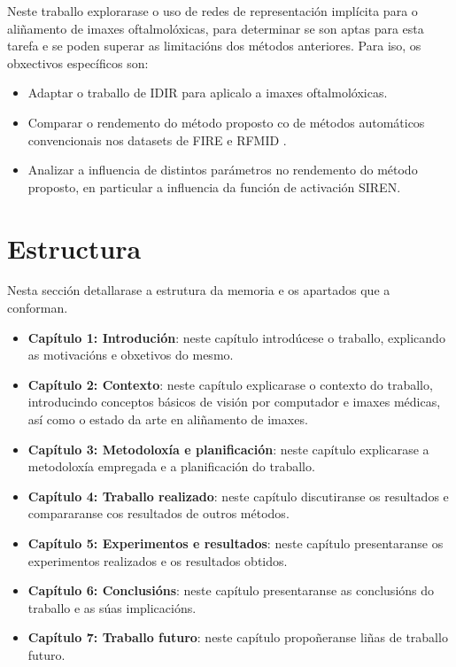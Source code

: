 Neste traballo explorarase o uso de redes de representación implícita para o aliñamento de imaxes oftalmolóxicas, para determinar se son aptas para esta tarefa e se poden superar as limitacións dos métodos anteriores.
Para iso, os obxectivos específicos son:
\begin{itemize}
    \item Adaptar o traballo de IDIR \cite{wolterink2021implicit} para aplicalo a imaxes oftalmolóxicas.
    \item Comparar o rendemento do método proposto co de métodos automáticos convencionais nos datasets de FIRE \cite{FIRE} e RFMID \cite{RFMiD}.
    \item Analizar a influencia de distintos parámetros no rendemento do método proposto, en particular a influencia da función de activación SIREN.
\end{itemize}

\section{Estructura }

Nesta sección detallarase a estrutura da memoria e os apartados que a conforman.

\begin{itemize}
    \item \textbf{Capítulo 1: Introdución}: neste capítulo introdúcese o traballo, explicando as motivacións e obxetivos do mesmo.
    \item \textbf{Capítulo 2: Contexto}: neste capítulo explicarase o contexto do traballo, introducindo conceptos básicos de visión por computador e imaxes médicas, así como o estado da arte en aliñamento de imaxes.
    \item \textbf{Capítulo 3: Metodoloxía e planificación}: neste capítulo explicarase a metodoloxía empregada e a planificación do traballo.
    \item \textbf{Capítulo 4: Traballo realizado}: neste capítulo discutiranse os resultados e compararanse cos resultados de outros métodos.
    \item \textbf{Capítulo 5: Experimentos e resultados}: neste capítulo presentaranse os experimentos realizados e os resultados obtidos. 
    \item \textbf{Capítulo 6: Conclusións}: neste capítulo presentaranse as conclusións do traballo e as súas implicacións.
    \item \textbf{Capítulo 7: Traballo futuro}: neste capítulo propoñeranse liñas de traballo futuro.
\end{itemize}
